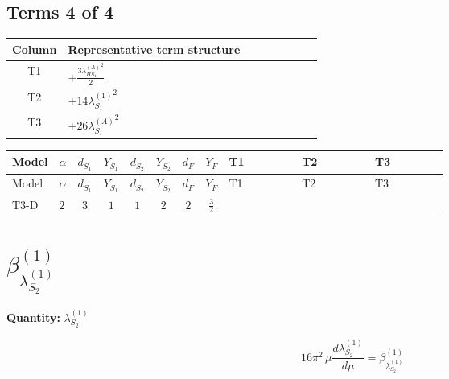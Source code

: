 \documentclass[8pt]{article}
\begin{document}
\begin{landscape}
\subsection*{Terms 4 of 4}
\begin{center}
\begin{tabular}{@{}c >{\raggedright\arraybackslash}p{0.82\linewidth}@{}}
\toprule
Column & Representative term structure \\
\midrule
T1 & \(\displaystyle +\frac{3 {\lambda_{HS_1}^{(A)}}^2}{2}\) \\
\midrule
T2 & \(\displaystyle +14 {\lambda_{S_1}^{(1)}}^2\) \\
\midrule
T3 & \(\displaystyle +26 {\lambda_{S_1}^{(A)}}^2\) \\
\midrule
\bottomrule
\end{tabular}
\end{center}
\smallskip
\tiny
\begin{longtable}{@{}llcccccc >{\raggedright\arraybackslash}p{0.21\linewidth} >{\raggedright\arraybackslash}p{0.21\linewidth} >{\raggedright\arraybackslash}p{0.21\linewidth}@{}}
\toprule
Model & $\alpha$ & $d_{S_1}$ & $Y_{S_1}$ & $d_{S_2}$ & $Y_{S_2}$ & $d_F$ & $Y_F$ & T1 & T2 & T3 \\
\midrule
\endfirsthead
\toprule
Model & $\alpha$ & $d_{S_1}$ & $Y_{S_1}$ & $d_{S_2}$ & $Y_{S_2}$ & $d_F$ & $Y_F$ & T1 & T2 & T3 \\
\midrule
\endhead
T3-D & $2$ & $3$ & $1$ & $1$ & $2$ & $2$ & $\frac{3}{2}$ & \scriptsize\adjustbox{max width=\linewidth}{$\begin{gathered} +\frac{3 {\lambda_{HS_1}^{(A)}}^2}{2}\end{gathered}$} & \scriptsize\adjustbox{max width=\linewidth}{$\begin{gathered} +14 {\lambda_{S_1}^{(1)}}^2\end{gathered}$} & \scriptsize\adjustbox{max width=\linewidth}{$\begin{gathered} +26 {\lambda_{S_1}^{(A)}}^2\end{gathered}$} \\
\midrule
\bottomrule
\end{longtable}
\clearpage
\section*{$\beta_{\lambda_{S_2}^{(1)}}^{(1)}$}
\noindent\textbf{Quantity: }$\lambda_{S_2}^{(1)}$\par\smallskip
\[16\pi^2\,\mu\frac{d \lambda_{S_2}^{(1)}}{d\mu}=\beta_{\lambda_{S_2}^{(1)}}^{(1)}\]

\end{landscape}
\end{document}
